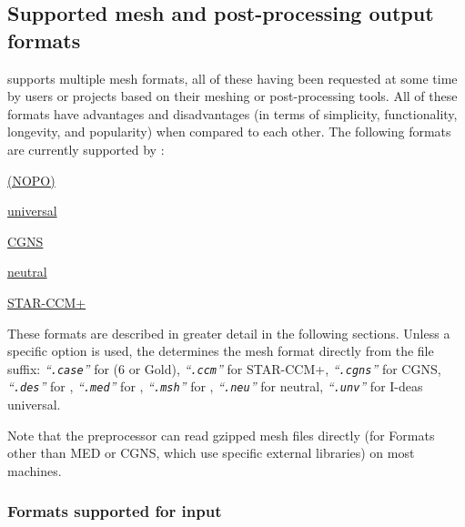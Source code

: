 {{{\smallskip \noindent

\subsection{Supported mesh and post-processing output formats
\label{sec:formats}}

\CS supports multiple mesh formats, all of these having been requested
at some time by users or projects based on their meshing or post-processing
tools. All of these formats have advantages and disadvantages (in terms
of simplicity, functionality, longevity, and popularity) when compared to
each other. The following formats are currently supported by \CS:

\begin{list}{-}{}

\item \hyperref[fmtdesc:des]{\simail (NOPO)}
\item \hyperref[fmtdesc:unv]{\ideas universal}
\item \hyperref[fmtdesc:med]{\med}
\item \hyperref[fmtdesc:cgns]{CGNS}
\item \hyperref[fmtdesc:ensight6]{}
\item \hyperref[fmtdesc:ensightg]{\ensightg}
\item \hyperref[fmtdesc:neu]{\gambit neutral}
\item \hyperref[fmtdesc:gmsh]{\gmsh}
\item \hyperref[fmtdesc:ccm]{STAR-CCM+}
\end{list}

These formats are described in greater detail in the following sections.
Unless a specific option is used, the \pcs determines the mesh format directly
from the file suffix: %
{\em``\texttt{.case}''} for \ensight (6 or Gold),
{\em``\texttt{.ccm}''} for STAR-CCM+,
{\em``\texttt{.cgns}''} for CGNS,
{\em``\texttt{.des}''} for \simail,
{\em``\texttt{.med}''} for \med,
{\em``\texttt{.msh}''} for \gmsh,
{\em``\texttt{.neu}''} for \gambit neutral,
{\em``\texttt{.unv}''} for I-deas universal.

Note that the preprocessor can read gzipped mesh files directly (for Formats
other than MED or CGNS, which use specific external libraries) on most machines.

\subsubsection{Formats supported for input\label{sec:formats_in}}

}}}
